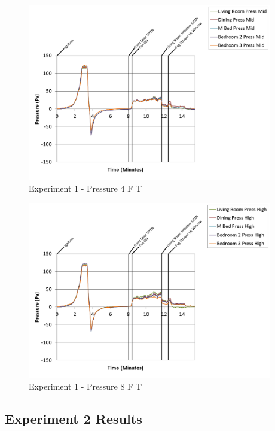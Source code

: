 \documentclass{article}
\begin{document}
\begin{appendices}
\begin{figure}[h!]
	\centering
	\includegraphics[height=3.05in]{0_Images/Results_Charts/Exp_1_Charts/Pressure4FT.png}
	\caption{Experiment 1 - Pressure 4 F T}
\end{figure}

\clearpage

\begin{figure}[h!]
	\centering
	\includegraphics[height=3.05in]{0_Images/Results_Charts/Exp_1_Charts/Pressure8FT.png}
	\caption{Experiment 1 - Pressure 8 F T}
\end{figure}


\clearpage
\clearpage		\large
\subsection{Experiment 2 Results} \label{App:Exp2Results} 


\end{appendices}
\end{document}

